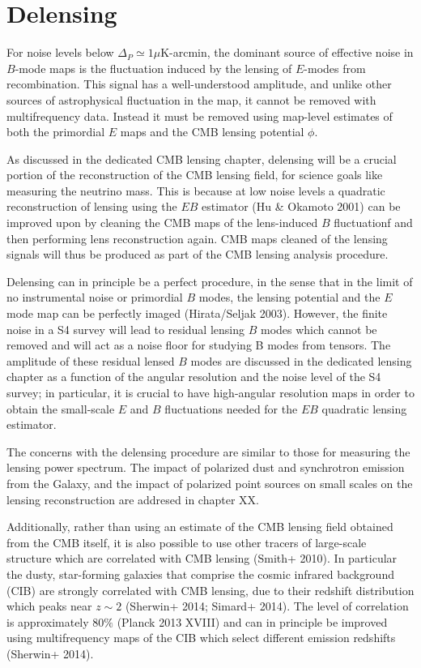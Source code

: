 \section{Delensing}\label{delens}

For noise levels below $\Delta_P \simeq 1 \mu$K-arcmin,  the dominant source of effective noise in $B$-mode maps is the fluctuation induced by the lensing of $E$-modes from recombination.  This signal has a well-understood amplitude, and unlike other sources of astrophysical fluctuation in the map, it cannot be removed with multifrequency data.  Instead it must be removed using map-level estimates of both the primordial $E$ maps and the CMB lensing potential $\phi$.

As discussed in the dedicated CMB lensing chapter, delensing will be a crucial portion of the reconstruction of the CMB lensing field, for science goals like measuring the neutrino mass.  This is because at low noise levels a quadratic reconstruction of lensing using the $EB$ estimator (Hu \& Okamoto 2001) can be improved upon by cleaning the CMB maps of the lens-induced $B$ fluctuationf and then performing lens reconstruction again.  CMB maps cleaned of the lensing signals will thus be produced as part of the CMB lensing analysis procedure.

Delensing can in principle be a perfect procedure, in the sense that in the limit of no instrumental noise or primordial $B$ modes, the lensing potential and the $E$ mode map can be perfectly imaged (Hirata/Seljak 2003).  However, the finite noise in a S4 survey will lead to residual lensing $B$ modes which cannot be removed and will act as a noise floor for studying B modes from tensors.  The amplitude of these residual lensed $B$ modes are discussed in the dedicated lensing chapter as a function of the angular resolution and the noise level of the S4 survey; in particular, it is crucial to have high-angular resolution maps in order to obtain the small-scale $E$ and $B$ fluctuations needed for the $EB$ quadratic lensing estimator.

The concerns with the delensing procedure are similar to those for measuring the lensing power spectrum. The impact of polarized dust and synchrotron emission from the Galaxy, and the impact of polarized point sources on small scales on the lensing reconstruction are addresed in chapter XX.

Additionally, rather than using an estimate of the CMB lensing field obtained from the CMB itself, it is also possible to use other tracers of large-scale structure which are correlated with  CMB lensing (Smith+ 2010).  In particular the dusty, star-forming galaxies that comprise the cosmic infrared background (CIB) are strongly correlated with CMB lensing, due to their redshift distribution which peaks near $z \sim 2$ (Sherwin+ 2014; Simard+ 2014).  The level of correlation is approximately $80\%$ (Planck 2013 XVIII) and can in principle be improved using multifrequency maps of the CIB which select different emission redshifts (Sherwin+ 2014). 


